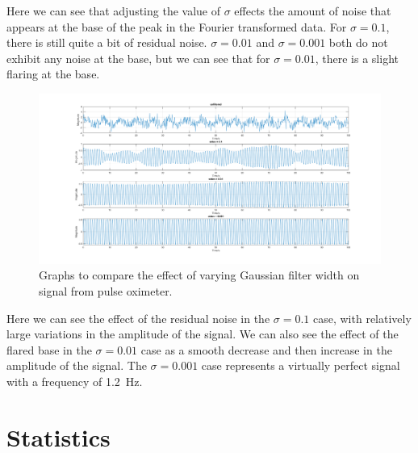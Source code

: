 \documentclass[11pt]{article}
\numberwithin{equation}{section}
\begin{document}
Here we can see that adjusting the value of $\sigma$ effects the amount of noise that appears at the base of the peak in the Fourier transformed data. For $\sigma = 0.1$, there is still quite a bit of residual noise. $\sigma = 0.01$ and $\sigma = 0.001$ both do not exhibit any noise at the base, but we can see that for $\sigma = 0.01$, there is a slight flaring at the base.
\begin{figure}[H]
    \centering
    \includegraphics[width = \textwidth]{./img/q306b.png}
    \caption{Graphs to compare the effect of varying Gaussian filter width on signal from pulse oximeter.}
    \label{fig:q306b}
\end{figure}
Here we can see the effect of the residual noise in the $\sigma = 0.1$ case, with relatively large variations in the amplitude of the signal. We can also see the effect of the flared base in the $\sigma = 0.01$ case as a smooth decrease and then increase in the amplitude of the signal. The $\sigma = 0.001$ case represents a virtually perfect signal with a frequency of \SI{1.2}{\hertz}.
\section{Statistics}
\end{document}
